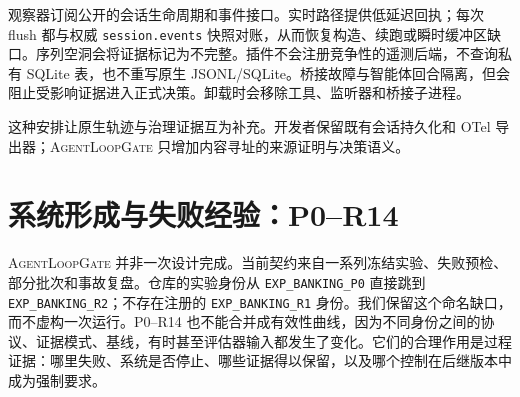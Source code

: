 \documentclass[UTF8,10pt,twocolumn,fontset=none]{ctexart}
\newcommand{\system}{\textsc{AgentLoopGate}\xspace}
\newcommand{\code}[1]{\texttt{#1}}
\begin{document}
观察器订阅公开的会话生命周期和事件接口。实时路径提供低延迟回执；每次 flush 都与权威 \code{session.events} 快照对账，从而恢复构造、续跑或瞬时缓冲区缺口。序列空洞会将证据标记为不完整。插件不会注册竞争性的遥测后端，不查询私有 SQLite 表，也不重写原生 JSONL/SQLite。桥接故障与智能体回合隔离，但会阻止受影响证据进入正式决策。卸载时会移除工具、监听器和桥接子进程。

这种安排让原生轨迹与治理证据互为补充。开发者保留既有会话持久化和 OTel 导出器；\system 只增加内容寻址的来源证明与决策语义。

\section{系统形成与失败经验：P0--R14}

\system 并非一次设计完成。当前契约来自一系列冻结实验、失败预检、部分批次和事故复盘。仓库的实验身份从 \code{EXP\_BANKING\_P0} 直接跳到 \code{EXP\_BANKING\_R2}；不存在注册的 \code{EXP\_BANKING\_R1} 身份。我们保留这个命名缺口，而不虚构一次运行。P0--R14 也不能合并成有效性曲线，因为不同身份之间的协议、证据模式、基线，有时甚至评估器输入都发生了变化。它们的合理作用是过程证据：哪里失败、系统是否停止、哪些证据得以保留，以及哪个控制在后继版本中成为强制要求。
\end{document}
